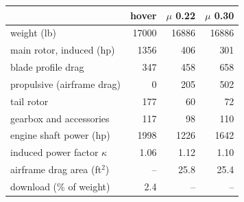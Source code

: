\begin{tabular}{@{}lrrr@{}}
\toprule
 & hover & $\mu$ 0.22 & $\mu$ 0.30 \\
\midrule
weight (lb) & 17000 & 16886 & 16886 \\
main rotor, induced (hp) & 1356 & 406 & 301 \\
\quad blade profile drag & 347 & 458 & 658 \\
\quad propulsive (airframe drag) & 0 & 205 & 502 \\
tail rotor & 177 & 60 & 72 \\
gearbox and accessories & 117 & 98 & 110 \\
\midrule
engine shaft power (hp) & 1998 & 1226 & 1642 \\
induced power factor $\kappa$ & 1.06 & 1.12 & 1.10 \\
airframe drag area (ft$^2$) & -- & 25.8 & 25.4 \\
download (\% of weight) & 2.4 & -- & -- \\
\bottomrule
\end{tabular}
